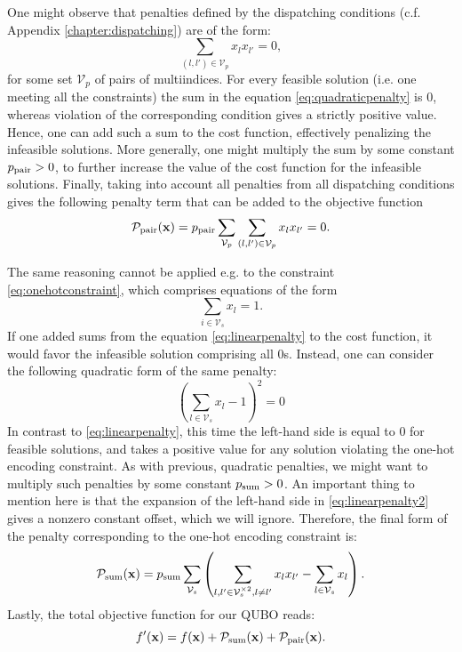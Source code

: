 One might observe that penalties defined by the dispatching conditions (c.f.
Appendix \ref{chapter:dispatching}) are of the form:
\begin{equation}
  \label{eq:quadraticpenalty}
  \sum_{(l, l') \in \mathcal{V}_{p}} x_{l}x_{l'} = 0,
\end{equation}
for some set $\mathcal{V}_{p}$ of pairs of multiindices. For every feasible
solution (i.e. one meeting all the constraints) the sum in the equation
\eqref{eq:quadraticpenalty} is 0, whereas violation of the corresponding
condition gives a strictly positive value. Hence, one can add such a sum to the
cost function, effectively penalizing the infeasible solutions. More generally,
one might multiply the sum by some constant $p_{\text{pair}} > 0$, to further increase
the value of the cost function for the infeasible solutions. Finally, taking
into account all penalties from all dispatching conditions gives the following
penalty term that can be added to the objective function
\begin{equation}
  \mathcal{P}_{\text{pair}}(\mathbf{x}) = p_{\text{pair}} \sum_{\mathcal{V}_{p}}\sum_{(l, l') \in \mathcal{V}_{p}} x_{l}x_{l'} = 0.
\end{equation}

The same reasoning cannot be applied e.g. to the constraint
\eqref{eq:onehotconstraint}, which comprises equations of the form
\begin{equation}
  \label{eq:linearpenalty}
  \sum_{i \in \mathcal{V}_{s}}x_{l} = 1.
\end{equation}
If one added sums from the equation \eqref{eq:linearpenalty} to the cost
function, it would favor the infeasible solution comprising all 0s. Instead,
one can consider the following quadratic form of the same penalty:
\begin{equation}
  \label{eq:linearpenalty2}
  \left(\sum_{l \in \mathcal{V}_{s}}x_{l} -1 \right)^{2} = 0
\end{equation}
In contrast to \eqref{eq:linearpenalty}, this time the left-hand side is equal
to 0 for feasible solutions, and takes a positive value for any solution
violating the one-hot encoding constraint. As with previous, quadratic
penalties, we might want to multiply such penalties by some constant $p_{\text{sum}} >
  0$. An important thing to mention here is that the expansion of the left-hand
side in \eqref{eq:linearpenalty2} gives a nonzero constant offset, which we
will ignore. Therefore, the final form of the penalty corresponding to the
one-hot encoding constraint is:
\begin{equation}
  \mathcal{P}_{\text{sum}}(\mathbf{x}) = p_{\text{sum}} \sum_{\mathcal{V}_{s}}\left(\sum_{l,l' \in \mathcal{V}_{s}^{\times 2}, l\ne l'} x_{l}x_{l'}  - \sum_{l \in \mathcal{V}_{s}}x_{l}\right).
\end{equation}
Lastly, the total objective function for our QUBO reads:
\begin{equation}
  f'(\mathbf{x}) = f(\mathbf{x}) + \mathcal{P}_{\text{sum}}(\mathbf{x}) + \mathcal{P}_{\text{pair}}(\mathbf{x}).
\end{equation}

